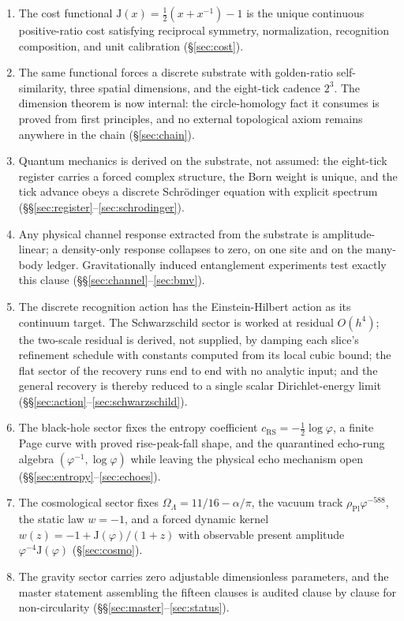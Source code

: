 \documentclass[11pt,letterpaper]{article}
\theoremstyle{definition}
\newcommand{\J}{\mathrm{J}}
\newcommand{\phiG}{\varphi}
\newcommand{\RS}{\mathrm{RS}}
\newcommand{\Pl}{\mathrm{Pl}}
\newcommand{\half}{\tfrac{1}{2}}
\begin{document}
\begin{enumerate}[nosep]
\item The cost functional $\J(x)=\half(x+x^{-1})-1$ is the unique
  continuous positive-ratio cost satisfying reciprocal symmetry,
  normalization, recognition composition, and unit calibration
  (\S\ref{sec:cost}).
\item The same functional forces a discrete substrate with golden-ratio
  self-similarity, three spatial dimensions, and the eight-tick cadence
  $2^3$.  The dimension theorem is now internal: the circle-homology
  fact it consumes is proved from first principles, and no external
  topological axiom remains anywhere in the chain (\S\ref{sec:chain}).
\item Quantum mechanics is derived on the substrate, not assumed: the
  eight-tick register carries a forced complex structure, the Born
  weight is unique, and the tick advance obeys a discrete
  Schr\"odinger equation with explicit spectrum
  (\S\S\ref{sec:register}--\ref{sec:schrodinger}).
\item Any physical channel response extracted from the substrate is
  amplitude-linear; a density-only response collapses to zero, on one
  site and on the many-body ledger.  Gravitationally induced
  entanglement experiments test exactly this clause
  (\S\S\ref{sec:channel}--\ref{sec:bmv}).
\item The discrete recognition action has the Einstein-Hilbert action
  as its continuum target.  The Schwarzschild sector is worked at
  residual $O(h^4)$; the two-scale residual is derived, not supplied,
  by damping each slice's refinement schedule with constants computed
  from its local cubic bound; the flat sector of the recovery runs end
  to end with no analytic input; and the general recovery is thereby
  reduced to a single scalar Dirichlet-energy limit
  (\S\S\ref{sec:action}--\ref{sec:schwarzschild}).
\item The black-hole sector fixes the entropy coefficient
  $c_\RS=-\half\log\phiG$, a finite Page curve with proved
  rise-peak-fall shape, and the quarantined echo-rung algebra
  $(\phiG^{-1},\log\phiG)$ while leaving the physical echo mechanism
  open (\S\S\ref{sec:entropy}--\ref{sec:echoes}).
\item The cosmological sector fixes
  $\Omega_\Lambda=11/16-\alpha/\pi$, the vacuum track
  $\rho_\Pl\phiG^{-588}$, the static law $w=-1$, and a forced dynamic
  kernel $w(z)=-1+\J(\phiG)/(1+z)$ with observable present amplitude
  $\phiG^{-4}\J(\phiG)$ (\S\ref{sec:cosmo}).
\item The gravity sector carries zero adjustable dimensionless
  parameters, and the master statement assembling the fifteen clauses
  is audited clause by clause for non-circularity
  (\S\S\ref{sec:master}--\ref{sec:status}).
\end{enumerate}
\end{document}
